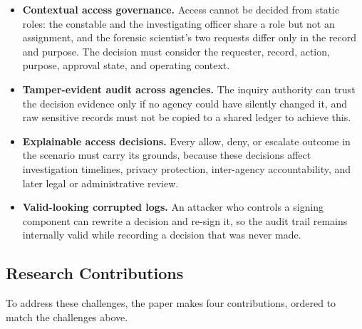 \begin{itemize}
    \item \textbf{Contextual access governance.} Access cannot be decided from
    static roles: the constable and the investigating officer share a role but
    not an assignment, and the forensic scientist's two requests differ only in
    the record and purpose. The decision must consider the requester, record,
    action, purpose, approval state, and operating context.

    \item \textbf{Tamper-evident audit across agencies.} The inquiry authority
    can trust the decision evidence only if no agency could have silently
    changed it, and raw sensitive records must not be copied to a shared ledger
    to achieve this.

    \item \textbf{Explainable access decisions.} Every allow, deny, or escalate
    outcome in the scenario must carry its grounds, because these decisions
    affect investigation timelines, privacy protection, inter-agency
    accountability, and later legal or administrative review.

    \item \textbf{Valid-looking corrupted logs.} An attacker who controls a
    signing component can rewrite a decision and re-sign it, so the audit trail
    remains internally valid while recording a decision that was never made.
\end{itemize}

\subsection{Research Contributions}

To address these challenges, the paper makes four contributions, ordered to
match the challenges above.


